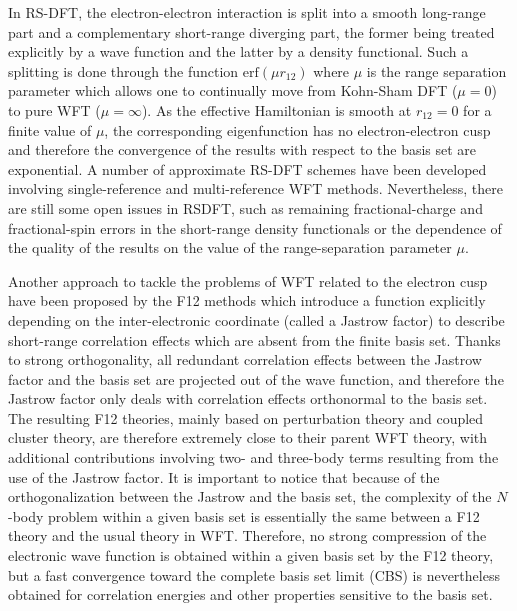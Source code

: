 \documentclass[aip,jcp,reprint,noshowkeys,superscriptaddress]{revtex4-1}
\begin{document}
In RS-DFT\cite{Sav-INC-96a,TouColSav-PRA-04}, the electron-electron interaction is split into a smooth long-range part and a complementary short-range diverging part, the former being treated explicitly by a wave function and the latter by a density functional. 
Such a splitting is done through the function $\text{erf}(\mu r_{12})$ where $\mu$ is the range separation parameter which allows one to continually move from Kohn-Sham DFT ($\mu=0$) to pure WFT ($\mu=\infty$). 
As the effective Hamiltonian is smooth at $r_{12}=0$ for a finite value of $\mu$, the corresponding eigenfunction has no electron-electron cusp\cite{GorSav-PRA-06} and therefore the convergence of the results with respect to the basis set are exponential\cite{FraMusLupTou-JCP-15}. 
A number of approximate RS-DFT schemes have been developed involving single-reference\cite{AngGerSavTou-PRA-05, GolWerSto-PCCP-05, TouGerJanSavAng-PRL-09,JanHenScu-JCP-09,TouZhuSavJanAng-JCP-11, MusReiAngTou-JCP-15,KalTou-JCP-18,KalMusTou-JCP-19} and multi-reference\cite{LeiStoWerSav-CPL-97, FroTouJen-JCP-07, FroCimJen-PRA-10, HedKneKieJenRei-JCP-15, HedTouJen-JCP-18, FerGinTou-JCP-18} WFT methods. 
Nevertheless, there are still some open issues in RSDFT, such as remaining fractional-charge and fractional-spin errors in the short-range density functionals \cite{MusTou-MP-17} or the dependence of the quality of the results on the value of the range-separation parameter $\mu$. 

Another approach to tackle the problems of WFT related to the electron cusp have been proposed by the F12 methods which introduce a function explicitly depending on the inter-electronic coordinate\cite{Ten-TCA-12,TenNog-WIREs-12,HatKloKohTew-CR-12, KonBisVal-CR-12, GruHirOhnTen-JCP-17, MaWer-WIREs-18} (called a Jastrow factor) to describe short-range correlation effects which are absent from the finite basis set. Thanks to strong orthogonality, 
all redundant correlation effects between the Jastrow factor and the basis set are projected out of the wave function, 
and therefore the Jastrow factor only deals with correlation effects orthonormal to the basis set. 
The resulting F12 theories, mainly based on perturbation theory and coupled cluster theory, are therefore 
extremely close to their parent WFT theory, with additional contributions involving two- and three-body terms resulting from the use of the Jastrow factor. 
It is important to notice that because of the orthogonalization between the Jastrow and the basis set, 
the complexity of the $N$-body problem within a given basis set is essentially the same between a F12 theory and the usual theory in WFT. Therefore, no strong compression of the electronic wave function is obtained within a given basis set by the F12 theory, 
but a fast convergence toward the complete basis set limit (CBS) is nevertheless obtained for correlation energies and other properties sensitive to the basis set.  
\end{document}
